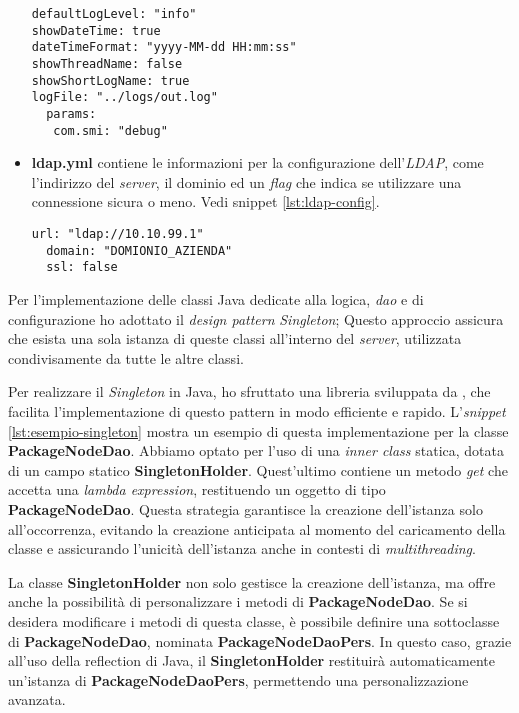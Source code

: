 \begin{itemize}
\begin{lstlisting}[caption={Esempio di configurazione del \textit{logger.yml}.},captionpos=b, label={lst:logger-config}]
defaultLogLevel: "info"
showDateTime: true
dateTimeFormat: "yyyy-MM-dd HH:mm:ss"
showThreadName: false
showShortLogName: true
logFile: "../logs/out.log"
  params:
   com.smi: "debug"
  \end{lstlisting}
 \item \textbf{ldap.yml} contiene le informazioni per la configurazione dell'\textit{LDAP}, come l'indirizzo del \textit{server}, 
 il dominio ed un \textit{flag} che indica se utilizzare una connessione sicura o meno. Vedi snippet \ref*{lst:ldap-config}.
  \begin{lstlisting}[caption={Esempio di configurazione dell'\textit{ldap.yml}.},captionpos=b, label={lst:ldap-config}]
  url: "ldap://10.10.99.1"
  domain: "DOMIONIO_AZIENDA"
  ssl: false
  \end{lstlisting}
\end{itemize}

Per l'implementazione delle classi Java dedicate alla logica, \textit{dao} e di configurazione ho adottato il 
\textit{design pattern} \textit{Singleton}; 
Questo approccio assicura che esista una sola istanza di queste classi 
all'interno del \textit{server}, utilizzata condivisamente da tutte le altre classi.

Per realizzare il \textit{Singleton} in Java, ho sfruttato una libreria sviluppata da \azienda{}, che facilita 
l'implementazione di questo pattern in modo efficiente e rapido. L'\textit{snippet} \ref*{lst:esempio-singleton} mostra un esempio 
di questa implementazione per la classe \textbf{PackageNodeDao}. Abbiamo optato per l'uso di una \textit{inner class} statica, 
dotata di un campo statico \textbf{SingletonHolder}. Quest'ultimo contiene un metodo \textit{get} che accetta una \textit{lambda expression}, 
restituendo un oggetto di tipo \textbf{PackageNodeDao}. Questa strategia garantisce la creazione dell'istanza solo all'occorrenza, 
evitando la creazione anticipata al momento del caricamento della classe e assicurando l'unicità dell'istanza anche in contesti di \textit{multithreading}.

La classe \textbf{SingletonHolder} non solo gestisce la creazione dell'istanza, ma offre anche la possibilità di personalizzare i metodi 
di \textbf{PackageNodeDao}. Se si desidera modificare i metodi di questa classe, è possibile definire una sottoclasse di \textbf{PackageNodeDao}, 
nominata \textbf{PackageNodeDaoPers}. In questo caso, grazie all'uso della \gls{reflection} di Java, 
il \textbf{SingletonHolder} restituirà automaticamente un'istanza di \textbf{PackageNodeDaoPers}, permettendo una personalizzazione avanzata.
\newpage


